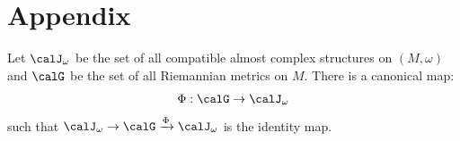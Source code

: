 \section{Appendix}


  \begin{theorem}\label{thm:compatible_almost_complex_structures_and_riemannian_metrics}
    Let $\calJ_\omega$ be the set of all compatible almost complex structures on $(M, \omega)$ and 
    $\calG$ be the set of all Riemannian metrics on $M$.
    There is a canonical map: 
    \[ \Phi: \calG \to \calJ_\omega \]
    such that $\calJ_\omega \to \calG \xrightarrow{\Phi} \calJ_\omega$ is the identity map.
  \end{theorem}